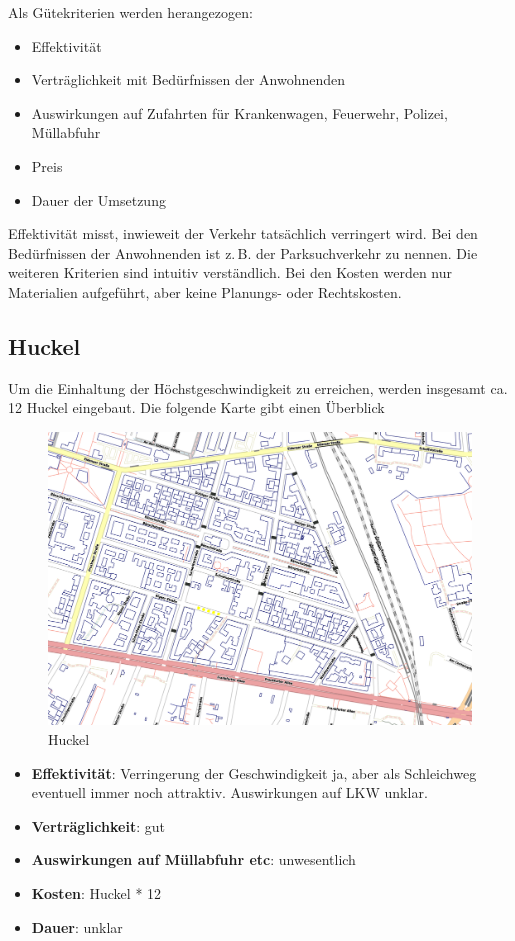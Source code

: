 \documentclass[a4paper,10pt]{scrartcl}
\begin{document}
Als Gütekriterien werden herangezogen:

\begin{itemize}
 \item Effektivität
 \item Verträglichkeit mit Bedürfnissen der Anwohnenden
 \item Auswirkungen auf Zufahrten für Krankenwagen, Feuerwehr, Polizei, Müllabfuhr
 \item Preis 
 \item Dauer der Umsetzung 
\end{itemize}

Effektivität misst, inwieweit der Verkehr tatsächlich verringert wird. Bei den Bedürfnissen der Anwohnenden ist z.\,B. der Parksuchverkehr zu nennen. Die weiteren Kriterien sind intuitiv verständlich. Bei den Kosten werden nur Materialien aufgeführt, aber keine Planungs- oder Rechtskosten.

\newpage 
\subsection{Huckel}
Um die Einhaltung der Höchstgeschwindigkeit zu erreichen, werden insgesamt ca. 12 Huckel eingebaut. Die folgende Karte gibt einen Überblick  

\begin{figure}[h]
\includegraphics[width=\textwidth]{huckel.png}
\caption{Huckel}
\end{figure}

\begin{itemize}
 \item \textbf{Effektivität}: Verringerung der Geschwindigkeit ja, aber als Schleichweg eventuell immer noch attraktiv. Auswirkungen auf LKW unklar. 
 \item \textbf{Verträglichkeit}: gut
 \item \textbf{Auswirkungen auf Müllabfuhr etc}: unwesentlich
 \item \textbf{Kosten}: Huckel * 12 
 \item \textbf{Dauer}: unklar  
\end{itemize}
\newpage
\end{document}
